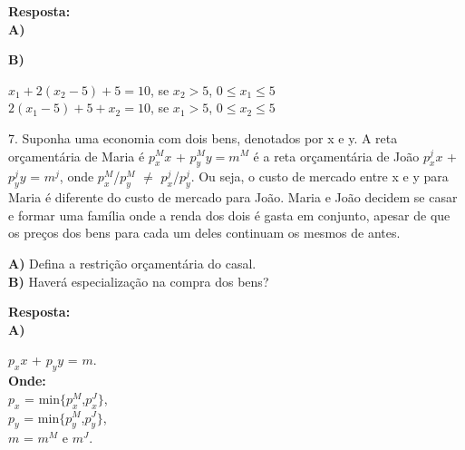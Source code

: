 \documentclass[a4paper, 12pt]{article} %
\begin{document}
\begin{flushleft}
\textbf{Resposta:}
\\
\textbf{A)}
\begin{center}
					
					
\end{center}

\textbf{B)}
\\
\begin{center}

{$x_{1}+2(x_{2}-5)+5=10$}, se {$x_{2}>5$}, {$0\leq$}{$x_{1}$}{$\leq5$}\\
{$2(x_{1}-5)+5+x_{2}=10$}, se {$x_{1}>5$}, {$0\leq$}{$x_{2}$}{$\leq5$}
\end{center}

7. Suponha uma economia com dois bens, denotados por x e y. A reta orçamentária de Maria é $p_{x}^{M}\textit{x}$ + $p_{y}^{M}\textit{y} = m^{M}$ é a reta orçamentária de João $p_{x}^{j}\textit{x}$ + $p_{y}^{j}\textit{y}$ = $m^{j}$, onde $p_{x}^{M}$/$p_{y}^{M}$ $\neq$ $p_{x}^{j}$/$p_{y}^{j}$. Ou seja, o custo de mercado entre x e y para Maria é diferente do custo de mercado para João. Maria e João decidem se casar e formar uma família onde a renda dos dois é gasta em conjunto, apesar de que os preços dos bens para cada um deles continuam os mesmos de antes.  \singlespacing

\textbf{A)} Defina a restrição orçamentária do casal.
\\
\textbf{B)} Haverá especialização na compra dos bens? \singlespacing

\textbf{Resposta:} 
\\
\textbf{A)} 
\\
\begin{center}

{$p_{x}x$} + {$p_{y}y$} = $m$.
\\

\textbf{Onde:}
\\
$p_{x}$ = min{$\lbrace$}{$p^M_x$},{$p^J_x$}{$\rbrace$},\\
$p_{y}$ = min{$\lbrace$}{$p^M_y$},{$p^J_y$}{$\rbrace$},\\
{$m$} = {$m^M$} e {$m^J$}.\\
\end{center}


\end{flushleft}
\end{document}
